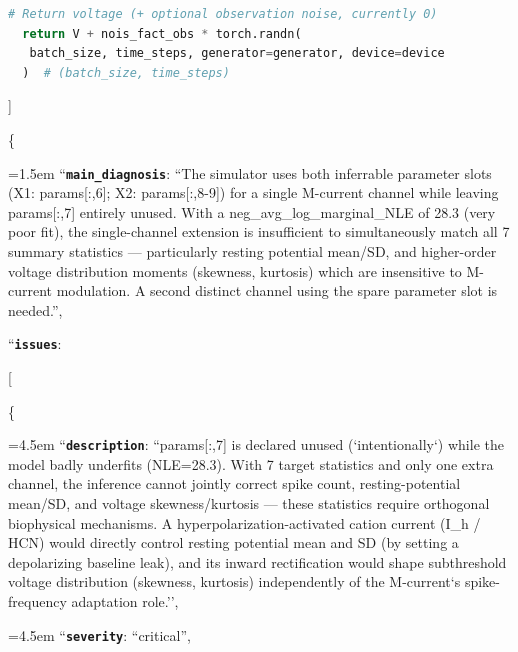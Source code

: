 \begin{tcolorbox}
\begin{lstlisting}[language=Python,style=pythonstyle]
  # Return voltage (+ optional observation noise, currently 0)
  return V + nois_fact_obs * torch.randn(
   batch_size, time_steps, generator=generator, device=device
  )  # (batch_size, time_steps)
\end{lstlisting}
\smallskip
\par\noindent [[ \#\# feedback \#\# ]]\\
\noindent
\par\noindent \{
\par\noindent\hangindent=1.5em \hspace*{1.5em}``\textbf{\texttt{main\_diagnosis}}\textquotesingle\textquotesingle: ``The simulator uses both inferrable parameter slots (X1: params[:,6]; X2: params[:,8-9]) for a single M-current channel while leaving params[:,7] entirely unused. With a neg\_avg\_log\_marginal\_NLE of 28.3 (very poor fit), the single-channel extension is insufficient to simultaneously match all 7 summary statistics --- particularly resting potential mean/SD, and higher-order voltage distribution moments (skewness, kurtosis) which are insensitive to M-current modulation. A second distinct channel using the spare parameter slot is needed.'',
\par\noindent \hspace*{1.5em}``\textbf{\texttt{issues}}\textquotesingle\textquotesingle:
\par\noindent \hspace*{1.5em}[
\par\noindent \hspace*{3.0em}\{
\par\noindent\hangindent=4.5em \hspace*{3.0em}\hspace*{1.5em}``\textbf{\texttt{description}}\textquotesingle\textquotesingle: ``params[:,7] is declared unused (`intentionally`) while the model badly underfits (NLE=28.3). With 7 target statistics and only one extra channel, the inference cannot jointly correct spike count, resting-potential mean/SD, and voltage skewness/kurtosis --- these statistics require orthogonal biophysical mechanisms. A hyperpolarization-activated cation current (I\_h / HCN) would directly control resting potential mean and SD (by setting a depolarizing baseline leak), and its inward rectification would shape subthreshold voltage distribution (skewness, kurtosis) independently of the M-current`s spike-frequency adaptation role.'',
\par\noindent\hangindent=4.5em \hspace*{3.0em}\hspace*{1.5em}``\textbf{\texttt{severity}}\textquotesingle\textquotesingle: ``critical'',

\end{tcolorbox}
